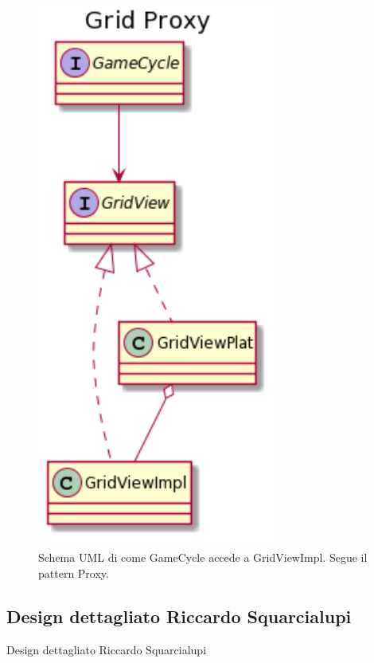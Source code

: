 \documentclass[a4paper,12pt]{report}
\begin{document}
	\begin{figure}[h]
	\centering{}
	\includegraphics[width=80mm]{images/ascenzo/grid_proxy.png}
	\caption{Schema UML di come GameCycle accede a GridViewImpl. Segue il pattern Proxy.}
	\label{img:gridmediator}
	\end{figure}

	\subsection{Design dettagliato Riccardo Squarcialupi}
	Design dettagliato Riccardo Squarcialupi
	\newline
\end{document}

